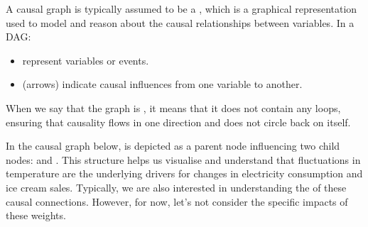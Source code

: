 \documentclass[letterpaper,10pt,english]{jupyterBook}
\begin{document}
\sphinxAtStartPar
A causal graph is typically assumed to be a , which is a graphical representation used to model and reason about the causal relationships between variables. In a DAG:
\begin{itemize}
\item {} 
\sphinxAtStartPar
{} represent variables or events.

\item {} 
\sphinxAtStartPar
{} (arrows) indicate causal influences from one variable to another.

\end{itemize}

\sphinxAtStartPar
When we say that the graph is , it means that it does not contain any loops, ensuring that causality flows in one direction and does not circle back on itself.

\sphinxAtStartPar
In the causal graph below,  is depicted as a parent node influencing two child nodes:  and . This structure helps us visualise and understand that fluctuations in temperature are the underlying drivers for changes in electricity consumption and ice cream sales. Typically, we are also interested in understanding the  of these causal connections. However, for now, let’s not consider the specific impacts of these weights.
\end{document}
